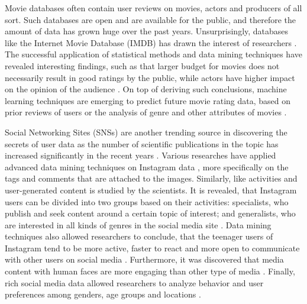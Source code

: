 Movie databases often contain user reviews on movies, actors and producers of all sort. Such databases are open and are available for the public, and therefore the amount of data has grown huge over the past years. Unsurprisingly, databases like the Internet Movie Database (IMDB) has drawn the interest of researchers \cite{saraee2004data, kabinsingha2012movie, sumathi2013performance}. The successful application of statistical methods and data mining techniques have revealed interesting findings, such as that larger budget for movies does not necessarily result in good ratings by the public, while actors have higher impact on the opinion of the audience \cite{saraee2004data}. On top of deriving such conclusions, machine learning techniques are emerging to predict future movie rating data, based on prior reviews of users \cite{saraee2004data} or the analysis of genre and other attributes of movies \cite{kabinsingha2012movie}.

Social Networking Sites (SNSs) are another trending source in discovering the secrets of user data as the number of scientific publications in the topic has increased significantly in the recent years \cite{waheed2017investigation}. Various researches have applied advanced data mining techniques on Instagram data \cite{jang2015noreciprocity, bakhshi2014faces, hu2014we, jang2016teensengagemorewithfewerphotos, han2016teensarefrommars}, more specifically on the tags and comments that are attached to the images. Similarly, like activities and user-generated content is studied by the scientists. It is revealed, that Instagram users can be divided into two groups based on their activities: specialists, who publish and seek content around a certain topic of interest; and generalists, who are interested in all kinds of genres in the social media site \cite{jang2015noreciprocity}. Data mining techniques also allowed researchers to conclude, that the teenager users of Instagram tend to be more active, faster to react and more open to communicate with other users on social media \cite{jang2016teensengagemorewithfewerphotos, han2016teensarefrommars}. Furthermore, it was discovered that media content with human faces are more engaging than other type of media \cite{bakhshi2014faces}. Finally, rich social media data allowed researchers to analyze behavior and user preferences among genders, age groups and locations \cite{farseev2015harvestingmultiplesources}.

